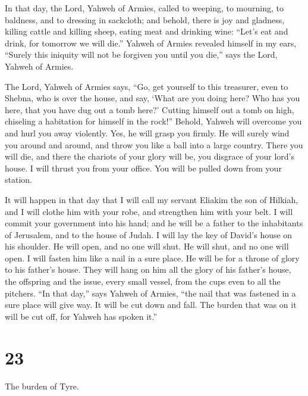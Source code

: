  In that day, the Lord, Yahweh of Armies, called to
weeping, to mourning, to baldness, and to dressing in sackcloth;
 and behold, there is joy and gladness, killing cattle
and killing sheep, eating meat and drinking wine: ``Let's eat and drink,
for tomorrow we will die.''  Yahweh of Armies revealed
himself in my ears, ``Surely this iniquity will not be forgiven you
until you die,'' says the Lord, Yahweh of Armies.

 The Lord, Yahweh of Armies says, ``Go, get yourself to
this treasurer, even to Shebna, who is over the house, and say,
 `What are you doing here? Who has you here, that you
have dug out a tomb here?' Cutting himself out a tomb on high, chiseling
a habitation for himself in the rock!''  Behold, Yahweh
will overcome you and hurl you away violently. Yes, he will grasp you
firmly.  He will surely wind you around and around, and
throw you like a ball into a large country. There you will die, and
there the chariots of your glory will be, you disgrace of your lord's
house.  I will thrust you from your office. You will be
pulled down from your station.

 It will happen in that day that I will call my servant
Eliakim the son of Hilkiah,  and I will clothe him with
your robe, and strengthen him with your belt. I will commit your
government into his hand; and he will be a father to the inhabitants of
Jerusalem, and to the house of Judah.  I will lay the key
of David's house on his shoulder. He will open, and no one will shut. He
will shut, and no one will open.  I will fasten him like
a nail in a sure place. He will be for a throne of glory to his father's
house.  They will hang on him all the glory of his
father's house, the offspring and the issue, every small vessel, from
the cups even to all the pitchers.  ``In that day,'' says
Yahweh of Armies, ``the nail that was fastened in a sure place will give
way. It will be cut down and fall. The burden that was on it will be cut
off, for Yahweh has spoken it.''

\hypertarget{section-22}{%
\section{23}\label{section-22}}

 The burden of Tyre.

